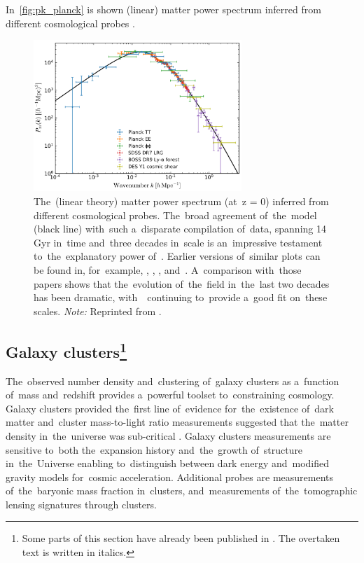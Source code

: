 In~\autoref{fig:pk_planck} is shown (linear) matter power spectrum inferred from different cosmological probes \parencite{2018arXiv180706205P}.
\begin{figure}[hbt]
    \centering
    \includegraphics[width=0.7\textwidth]{cosmo_evol/pk_planck.png}
    \caption{The~(linear theory) matter power spectrum (at~z = 0) inferred from different cosmological probes. The~broad agreement of~the~model (black line) with~such a~disparate compilation of~data, spanning 14 Gyr in~time and~three decades in~scale is an~impressive testament to~the~explanatory power of~\LCDM. Earlier versions of~similar plots can be found in, for~example, \textcite{1994ARA&A..32..319W}, \textcite{1995Sci...268..829S}, \textcite{2002PhRvD..66j3508T}, and~\textcite{2004ApJ...606..702T}. A~comparison with~those papers shows that the~evolution of~the~field in~the~last two decades has been dramatic, with~\LCDM\ continuing to~provide a~good fit on~these scales. \textit{Note:} Reprinted from \textcite{2018arXiv180706205P}.}
    \label{fig:pk_planck}
\end{figure}

\subsection[Galaxy clusters]{Galaxy clusters\footnote{Some parts of this section have already been published in \textcite{mastersthesis_vrastil}. The overtaken text is written in italics.}}
\label{ssec:gc}
The~observed number density and~clustering of~galaxy clusters as a~function of~mass and~redshift provides a~powerful toolset to~constraining cosmology.  Galaxy clusters provided the~first line of~evidence for~the~existence of~dark matter \textcite{zwicky} and~cluster mass-to-light ratio measurements suggested that the~matter density in~the~universe was sub-critical \textcite{Gott}. Galaxy clusters measurements are sensitive to~both the~expansion history and~the~growth of~structure in~the~Universe enabling to~distinguish between dark energy and~modified gravity models for~cosmic acceleration. Additional probes are measurements of~the~baryonic mass fraction in~clusters, and~measurements of~the~tomographic lensing signatures through clusters.

